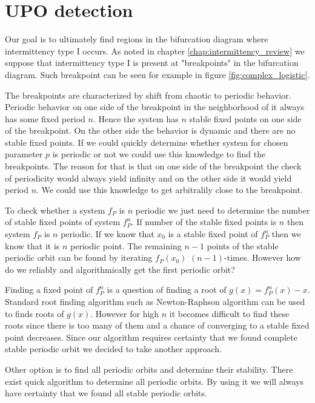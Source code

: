 \section{UPO detection}
Our goal is to ultimately find regions in the bifurcation diagram where intermittency type I occurs.
As noted in chapter \ref{chap:intermittency_review} we suppose that intermittency type I is present at "breakpoints" in the bifurcation diagram.
Such breakpoint can be seen for example in figure \ref{fig:complex_logistic}.
\par
The breakpoints are characterized by shift from chaotic to periodic behavior.
Periodic behavior on one side of the breakpoint in the neighborhood of it always has some fixed period $n$.
Hence the system has $n$ stable fixed points on one side of the breakpoint.
On the other side the behavior is dynamic and there are no stable fixed points.
If we could quickly determine whether system for chosen parameter $p$ is periodic or not we could use this knowledge to find the breakpoints.
The reason for that is that on one side of the breakpoint the check of periodicity would always yield infinity and on the other side it would yield period $n$.
We could use this knowledge to get arbitralily close to the breakpoint.
\par
To check whether a system $f_P$ is $n$ periodic we just need to determine the number of stable fixed points of system $f^{n}_P$.
If number of the stable fixed points is $n$ then system $f_P$ is $n$ periodic.
If we know that $x_0$ is a stable fixed point of $f^{n}_P$ then we know that it is $n$ periodic point.
The remaining $n-1$ points of the stable periodic orbit can be found by iterating $f_P(x_0)$ $(n-1)$-times.
However how do we reliably and algorithmically get the first periodic orbit?
\par
Finding a fixed point of $f^{n}_{P}$ is a question of finding a root of $g(x) = f^{n}_{P}(x) - x$.
Standard root finding algorithm such as Newton-Raphson algorithm can be used to finds roots of $g(x)$.
However for high $n$ it becomes difficult to find these roots since there is too many of them and a chance of converging to a stable fixed point decreases.
Since our algorithm requires certainty that we found complete stable periodic orbit we decided to take another approach.
\par
Other option is to find all periodic orbits and determine their stability.
There exist quick algorithm to determine all periodic orbits.
By using it we will always have certainty that we found all stable periodic orbits.

